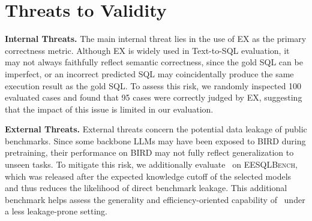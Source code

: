 \section{Threats to Validity}


\textbf{Internal Threats.}
The main internal threat lies in the use of EX as the primary correctness metric.
Although EX is widely used in Text-to-SQL evaluation, it may not always faithfully reflect semantic correctness, since the gold SQL can be imperfect, or an incorrect predicted SQL may coincidentally produce the same execution result as the gold SQL.
To assess this risk, we randomly inspected 100 evaluated cases and found that 95 cases were correctly judged by EX, suggesting that the impact of this issue is limited in our evaluation.
%
%

\textbf{External Threats.}
External threats concern the potential data leakage of public benchmarks.
Since some backbone LLMs may have been exposed to \textsc{BIRD} during pretraining, their performance on \textsc{BIRD} may not fully reflect generalization to unseen tasks.
To mitigate this risk, we additionally evaluate \toolname\ on \textsc{EESQLBench}, which was released after the expected knowledge cutoff of the selected models and thus reduces the likelihood of direct benchmark leakage.
This additional benchmark helps assess the generality and efficiency-oriented capability of \toolname\ under a less leakage-prone setting.

